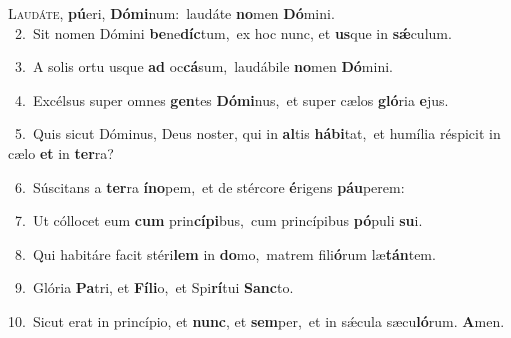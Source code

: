 \lettrine{\initial\textcolor{\initialcolor}{L}}{audáte,} \textbf{pú}\-eri, \textbf{Dó}\-\textbf{mi}num:~\star laudáte \textbf{no}\-men \textbf{Dó}\-mini.\\
{\numbfont\textcolor{\numbcolor}{~2.}}~Sit nomen Dómini \textbf{be}\-ne\-\textbf{díc}\-tum,~\star ex hoc nunc, et \textbf{us}\-que in \textbf{sǽ}\-culum.\par
{\numbfont\textcolor{\numbcolor}{~3.}}~A solis ortu usque \textbf{ad} oc\-\textbf{cá}\-sum,~\star laudábile \textbf{no}\-men \textbf{Dó}\-mini.\par
{\numbfont\textcolor{\numbcolor}{~4.}}~Excélsus super omnes \textbf{gen}\-tes \textbf{Dó}\-\textbf{mi}nus,~\star et super cælos \textbf{gló}\-ria \textbf{e}\-jus.\par
{\numbfont\textcolor{\numbcolor}{~5.}}~Quis sicut Dóminus, Deus noster, qui in \textbf{al}\-tis \textbf{há}\-\textbf{bi}tat,~\star et humília réspicit in cælo \textbf{et} in \textbf{ter}\-ra?\par
{\numbfont\textcolor{\numbcolor}{~6.}}~Súscitans a \textbf{ter}\-ra \textbf{ín}\-\textbf{o}pem,~\star et de stércore \textbf{é}\-rigens \textbf{páu}\-perem:\par
{\numbfont\textcolor{\numbcolor}{~7.}}~Ut cóllocet eum \textbf{cum} prin\-\textbf{cí}\-\textbf{pi}bus,~\star cum princípibus \textbf{pó}\-puli \textbf{su}\-i.\par
{\numbfont\textcolor{\numbcolor}{~8.}}~Qui habitáre facit stéri\textbf{lem} in \textbf{do}\-mo,~\star matrem fili\-\textbf{ó}\-rum læ\-\textbf{tán}\-tem.\par
{\numbfont\textcolor{\numbcolor}{~9.}}~Glória \textbf{Pa}\-tri, et \textbf{Fí}\-\textbf{li}o,~\star et Spi\-\textbf{rí}\-tui \textbf{Sanc}\-to.\par
{\numbfont\textcolor{\numbcolor}{10.}}~Sicut erat in princípio, et \textbf{nunc}\-, et \textbf{sem}\-per,~\star et in sǽcula sæcu\-\textbf{ló}\-rum. \textbf{A}\-men.\par
